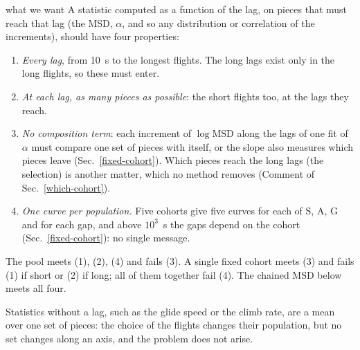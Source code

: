 \documentclass[10pt,a4paper]{article}
\newcommand{\G}{\mathrm{G}}
\newcommand{\A}{\mathrm{A}}
\newcommand{\Sl}{\mathrm{S}}
\begin{document}
\begin{method}{what we want}
  A statistic computed as a function of the lag, on pieces that must reach that lag (the MSD, $\alpha$, and so
  any distribution or correlation of the increments), should have four properties:
  \begin{enumerate}[label=(\arabic*)]
  \item \emph{Every lag}, from 10~s to the longest flights. The long lags exist only in the long flights, so
    these must enter.
  \item \emph{At each lag, as many pieces as possible}: the short flights too, at the lags they reach.
  \item \emph{No composition term}: each increment of $\log\mathrm{MSD}$ along the lags of one fit of $\alpha$
    must compare one set of pieces with itself, or the slope also measures which pieces leave
    (Sec.~\ref{fixed-cohort}). Which pieces reach the long lags (the selection) is another matter, which no
    method removes (Comment of Sec.~\ref{which-cohort}).
  \item \emph{One curve per population.} Five cohorts give five curves for each of $\Sl$, $\A$, $\G$ and for each
    gap, and above $10^3$~s the gaps depend on the cohort (Sec.~\ref{fixed-cohort}): no single message.
  \end{enumerate}
  The pool meets (1), (2), (4) and fails (3). A single fixed cohort meets (3) and fails (1) if short or (2) if
  long; all of them together fail (4). The chained MSD below meets all four.

  Statistics without a lag, such as the glide speed or the climb rate, are a mean over one set of pieces: the
  choice of the flights changes their population, but no set changes along an axis, and the problem does not
  arise.
\end{method}
\end{document}
